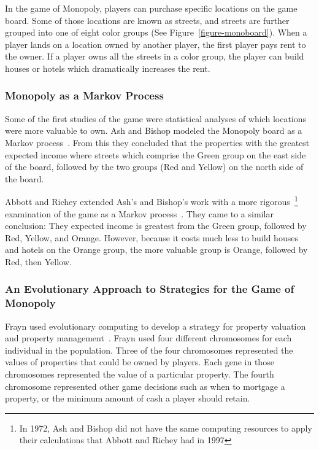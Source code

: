 In the game of Monopoly, players can purchase specific locations on the game
board. Some of those locations are known as streets, and streets are further
grouped into one of eight color groups (See Figure~\ref{figure-monoboard}). When
a player lands on a location owned by another player, the first player pays rent
to the owner. If a player owns all the streets in a color group, the player can
build houses or hotels which dramatically increases the rent.

\subsubsection{Monopoly as a Markov Process}

Some of the first studies of the game were statistical analyses of which
locations were more valuable to own. Ash and Bishop modeled the Monopoly board
as a Markov process~\cite{Ash1972}. From this they concluded that the properties
with the greatest expected income where streets which comprise the Green group
on the east side of the board, followed by the two groups (Red and Yellow) on
the north side of the board.

Abbott and Richey extended Ash's and Bishop's work with a more
rigorous~\footnote{In 1972, Ash and Bishop did not have the same computing
resources to apply their calculations that Abbott and Richey had in 1997}
examination of the game as a Markov process~\cite{Abbott1997}. They came to a
similar conclusion: They expected income is greatest from the Green group,
followed by Red, Yellow, and Orange. However, because it costs much less to
build houses and hotels on the Orange group, the more valuable group is Orange,
followed by Red, then Yellow.

\subsubsection{An Evolutionary Approach to Strategies for the Game of Monopoly}

Frayn used evolutionary computing to develop a strategy for property valuation
and property management~\cite{DBLP:conf/cig/Frayn05}. Frayn used four different
chromosomes for each individual in the population. Three of the four chromosomes
represented the values of properties that could be owned by players. Each gene
in those chromosomes represented the value of a particular property. The fourth
chromosome represented other game decisions such as when to mortgage a property,
or the minimum amount of cash a player should retain.

